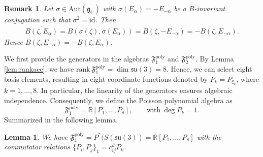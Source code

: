 \documentclass[11pt]{amsart}
\newtheorem{lemma}[theorem]{Lemma}
\theoremstyle{definition}
\theoremstyle{plain}
\newtheorem{remark}[theorem]{Remark}
\theoremstyle{conclusion}
\begin{document}
\begin{remark}
    Let $\sigma \in \mathrm{Aut}(\mathfrak{g}_\mathbb{C})$ with $\sigma(E_\alpha) = -E_{-\alpha}$ be a $B$-invariant conjugation such that $\sigma^2 = \mathrm{id}$. Then \begin{align*}
        \overline{B(\zeta,E_\alpha)} = B(\sigma(\zeta),\sigma(E_\alpha)) = B(\zeta, -E_{-\alpha}) = -B(\zeta,E_{-\alpha}).
    \end{align*} Hence $B(\zeta,E_{-\alpha}) = -  \overline{B(\zeta,E_\alpha)}$.
\end{remark}
 

We first provide the generators in the algebras $\mathfrak{F}_1^{\mathrm{poly}}$ and $\mathfrak{F}_2^{\mathrm{poly}}$. %
By Lemma \ref{lem:rankacc}, we have $\mathrm{rank} \, \mathfrak{F}_1^{\mathrm{poly}}= \dim \mathfrak{su}(3) = 8$. Hence, we can select eight basis elements, resulting in eight coordinate functions denoted by $ P_k=P_{\xi_k}$, where $ k=1,\ldots,8  $. In particular, the linearity of the generators ensures algebraic independence. Consequently, we define the Poisson polynomial algebra as $$ \mathfrak{F}_1^{\mathrm{poly}} =\mathbb{R}[P_1,\ldots,P_8], \qquad\text{with}\ \deg P_k=1. $$  Summarized in the following lemma.
\begin{lemma}
\label{lem:firf1}
    We have $\mathfrak{F}_1^{\mathrm{poly}} = P^*(S(\mathfrak{su}(3)) = \mathbb{R}[P_1,\ldots,P_8]$ with the commutator relations $\{P_i,P_j\}_1 = c_{ij}^kP_k$.
\end{lemma}
\end{document}
